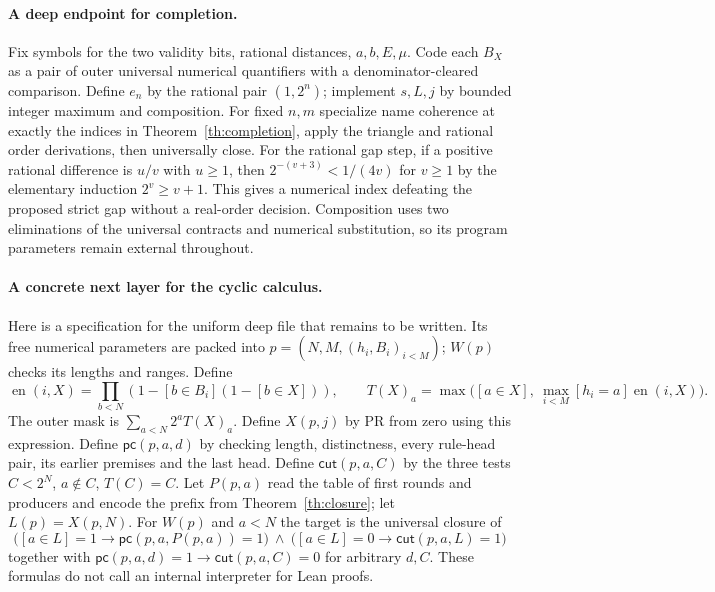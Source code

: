 \paragraph{A deep endpoint for completion.}
Fix symbols for the two validity bits, rational distances, $a,b,E,\mu$. Code each $B_X$ as a pair of outer universal numerical quantifiers with a denominator-cleared comparison. Define $e_n$ by the rational pair $(1,2^n)$; implement $s,L,j$ by bounded integer maximum and composition. For fixed $n,m$ specialize name coherence at exactly the indices in Theorem~\ref{th:completion}, apply the triangle and rational order derivations, then universally close. For the rational gap step, if a positive rational difference is $u/v$ with $u\ge1$, then $2^{-(v+3)}<1/(4v)$ for $v\ge1$ by the elementary induction $2^v\ge v+1$. This gives a numerical index defeating the proposed strict gap without a real-order decision. Composition uses two eliminations of the universal contracts and numerical substitution, so its program parameters remain external throughout.

\paragraph{A concrete next layer for the cyclic calculus.}
Here is a specification for the uniform deep file that remains to be written. Its free numerical parameters are packed into $p=(N,M,(h_i,B_i)_{i<M})$; $W(p)$ checks its lengths and ranges. Define
\[
 \operatorname{en}(i,X)=\prod_{b<N}(1-[b\in B_i](1-[b\in X])),\qquad
 T(X)_a=\max\bigl([a\in X],\ \max_{i<M}[h_i=a]\operatorname{en}(i,X)\bigr).
\]
The outer mask is $\sum_{a<N}2^a T(X)_a$. Define $X(p,j)$ by PR from zero using this expression. Define $\mathsf{pc}(p,a,d)$ by checking length, distinctness, every rule-head pair, its earlier premises and the last head. Define $\mathsf{cut}(p,a,C)$ by the three tests $C<2^N$, $a\notin C$, $T(C)=C$. Let $P(p,a)$ read the table of first rounds and producers and encode the prefix from Theorem~\ref{th:closure}; let $L(p)=X(p,N)$. For $W(p)$ and $a<N$ the target is the universal closure of
\[
 \bigl([a\in L]=1\to\mathsf{pc}(p,a,P(p,a))=1\bigr)
 \ \land\ 
 \bigl([a\in L]=0\to\mathsf{cut}(p,a,L)=1\bigr)
\]
together with $\mathsf{pc}(p,a,d)=1\to\mathsf{cut}(p,a,C)=0$ for arbitrary $d,C$. These formulas do not call an internal interpreter for Lean proofs.

